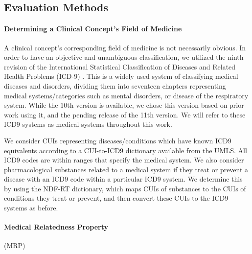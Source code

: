 \documentclass[10pt]{article}
\begin{document}


\subsection{Evaluation Methods}

\paragraph{Determining a Clinical Concept's Field of Medicine}
A clinical concept's corresponding field of medicine is not necessarily obvious. In order to have an objective and unambiguous classification, we utilized the ninth revision of the International Statistical Classification of Diseases and Related Health Problems (ICD-9) \cite{sleeInternationalClassificationDiseases1978}. This is a widely used system of classifying medical diseases and disorders, dividing them into seventeen chapters representing medical systems/categories such as mental disorders, or disease of the respiratory system. While the 10th version is available, we chose this version based on prior work using it, and the pending release of the 11th version. We will refer to these ICD9 systems as medical systems throughout this work. 

We consider CUIs representing diseases/conditions which have known ICD9 equivalents according to a CUI-to-ICD9 dictionary available from the UMLS. All ICD9 codes are within ranges that specify the medical system. We also consider pharmacological substances related to a medical system if they treat or prevent a disease with an ICD9 code within a particular ICD9 system. We determine this by using the NDF-RT dictionary, which maps CUIs of substances to the CUIs of conditions they treat or prevent, and then convert these CUIs to the ICD9 systems as before.  

\paragraph{Medical Relatedness Property}(MRP)
\end{document}
